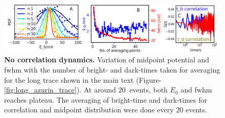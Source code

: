 \begin{figure}[!ht]
  \centering
  \includegraphics[width=\textwidth]{N_avgpoints_vs_fwhmwidth}
  \makeatletter
  \renewcommand{\fnum@figure}{\figurename~S\thefigure}
  \makeatother
  \caption{\textbf{No correlation dynamics.} Variation of midpoint potential and fwhm with the number of bright- and dark-times taken for averaging for the long trace shown in the main text (Figure-\ref{fig:long_azurin_trace}). At around $20~$ events, both $E_0$ and fwhm reaches plateau.
  The averaging of bright-time and dark-times for correlation and midpoint distribution were done every $20$ events.}
  \label{SIfig: N_avgpoints_vs_fwhmwidth}
\end{figure}


